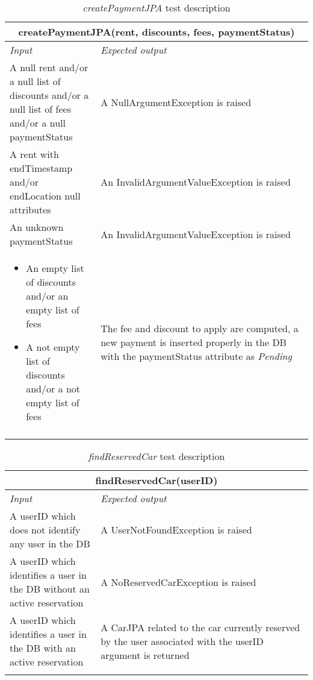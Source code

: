 \clearpage

\begin{longtable}{p{0.3\linewidth}p{0.7\linewidth}}
\multicolumn{2}{c}{\textbf{createPaymentJPA(rent, discounts, fees, paymentStatus)}} \\
\toprule
\emph{Input} & \emph{Expected output} \\
\midrule
A null rent and/or a null list of discounts and/or a null list of fees and/or a null paymentStatus & A NullArgumentException is raised\\
\midrule
A rent with endTimestamp and/or endLocation null attributes & An InvalidArgumentValueException is raised \\
\midrule
An unknown paymentStatus & An InvalidArgumentValueException is raised \\
\midrule
\begin{itemize}
\item An empty list of discounts and/or an empty list of fees
\item A not empty list of discounts and/or a not empty list of fees
\end{itemize} & The fee and discount to apply are computed, a new payment is inserted properly in the DB with the paymentStatus attribute as \emph{Pending}\\
\bottomrule
\caption{\emph{createPaymentJPA} test description}
\end{longtable}

\begin{longtable}{p{0.3\linewidth}p{0.7\linewidth}}
\multicolumn{2}{c}{\textbf{findReservedCar(userID)}} \\
\toprule
\emph{Input} & \emph{Expected output} \\
\midrule
A userID which does not identify any user in the DB & A UserNotFoundException is raised\\
\midrule
A userID which identifies a user in the DB without an active reservation & A NoReservedCarException is raised \\
\midrule
A userID which identifies a user in the DB with an active reservation & A CarJPA related to the car currently reserved by the user associated with the userID argument is returned \\
\bottomrule
\caption{\label{tbl:findReservedCar}\emph{findReservedCar} test description}
\end{longtable}

\clearpage

